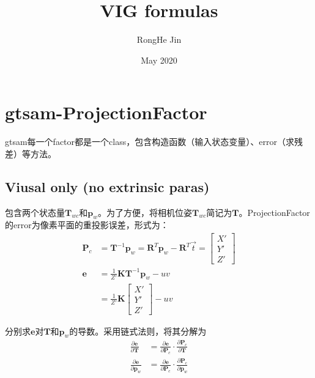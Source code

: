 \documentclass{article}
\title{VIG formulas}
\author{RongHe Jin}
\date{May 2020}
\begin{document}
\maketitle

\section{gtsam-ProjectionFactor}
gtsam每一个factor都是一个class，包含构造函数（输入状态变量）、error（求残差）等方法。

\subsection{Viusal only (no extrinsic paras)}\label{section:VisualPrj}
包含两个状态量$\boldsymbol{T}_{wc}$和$\boldsymbol{p}_w$。为了方便，将相机位姿$\boldsymbol{T}_{wc}$简记为$\boldsymbol{T}$。ProjectionFactor的error为像素平面的重投影误差，形式为：
\begin{equation}
	\begin{aligned}
		\boldsymbol{P}_c & =\boldsymbol{T}^{-1} \boldsymbol{p}_w =\boldsymbol{R}^T\boldsymbol{p}_w-\boldsymbol{R}^T\vec{t}  = 
		\left[
		\begin{matrix}
		X'\\
		Y'\\                                         
		Z' 
		\end{matrix}
		\right] \\
		\boldsymbol {e}  & =\frac{1}{Z'}\boldsymbol{K} \boldsymbol{T}^{-1} \boldsymbol{p}_w  -uv                              \\&=
		\frac{1}{Z'}\boldsymbol{K} 
		\left[
		\begin{matrix}
		X'\\
		Y'\\                                          
		Z' 
		\end{matrix}
		\right]-uv
	\end{aligned}
\end{equation}

分别求$\boldsymbol{e} $对$\boldsymbol{T} $和$\boldsymbol{p}_w $的导数。采用链式法则，将其分解为
\begin{equation}
	\begin{aligned}
		\frac{\partial{\boldsymbol{e}}}{\partial{\boldsymbol{T}}}   & = \frac{\partial{\boldsymbol{e}}}{\partial{\boldsymbol{P}_c}}\cdot \frac{\partial{\boldsymbol{P}_c}}{\partial{\boldsymbol{T}}}   
		\\
		\frac{\partial{\boldsymbol{e}}}{\partial{\boldsymbol{p}_w}} & = \frac{\partial{\boldsymbol{e}}}{\partial{\boldsymbol{P}_c}}\cdot \frac{\partial{\boldsymbol{P}_c}}{\partial{\boldsymbol{p}_w}} 
	\end{aligned}
\end{equation}
\end{document}
